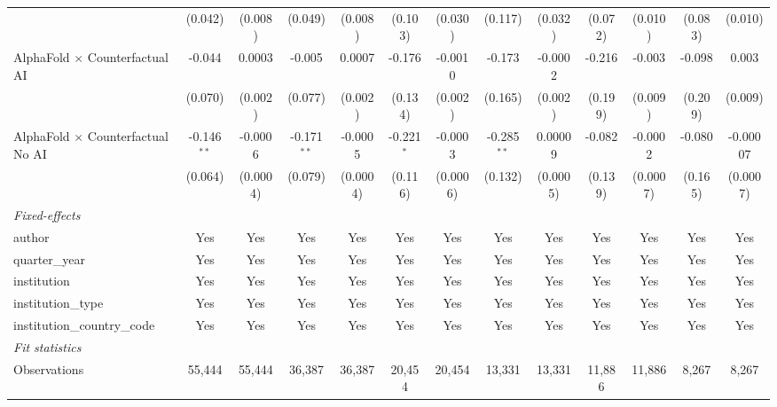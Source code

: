 \begin{tabular}{lcccccccccccc}
                                            & (0.042)       & (0.008)  & (0.049)       & (0.008)  & (0.103)      & (0.030)  & (0.117)       & (0.032)  & (0.072) & (0.010)  & (0.083) & (0.010)\\   
   AlphaFold $\times$ Counterfactual AI     & -0.044        & 0.0003   & -0.005        & 0.0007   & -0.176       & -0.0010  & -0.173        & -0.0002  & -0.216  & -0.003   & -0.098  & 0.003\\   
                                            & (0.070)       & (0.002)  & (0.077)       & (0.002)  & (0.134)      & (0.002)  & (0.165)       & (0.002)  & (0.199) & (0.009)  & (0.209) & (0.009)\\   
   AlphaFold $\times$ Counterfactual No AI  & -0.146$^{**}$ & -0.0006  & -0.171$^{**}$ & -0.0005  & -0.221$^{*}$ & -0.0003  & -0.285$^{**}$ & 0.00009  & -0.082  & -0.0002  & -0.080  & -0.00007\\   
                                            & (0.064)       & (0.0004) & (0.079)       & (0.0004) & (0.116)      & (0.0006) & (0.132)       & (0.0005) & (0.139) & (0.0007) & (0.165) & (0.0007)\\   
   \midrule
   \emph{Fixed-effects}\\
   author                                   & Yes           & Yes      & Yes           & Yes      & Yes          & Yes      & Yes           & Yes      & Yes     & Yes      & Yes     & Yes\\  
   quarter\_year                            & Yes           & Yes      & Yes           & Yes      & Yes          & Yes      & Yes           & Yes      & Yes     & Yes      & Yes     & Yes\\  
   institution                              & Yes           & Yes      & Yes           & Yes      & Yes          & Yes      & Yes           & Yes      & Yes     & Yes      & Yes     & Yes\\  
   institution\_type                        & Yes           & Yes      & Yes           & Yes      & Yes          & Yes      & Yes           & Yes      & Yes     & Yes      & Yes     & Yes\\  
   institution\_country\_code               & Yes           & Yes      & Yes           & Yes      & Yes          & Yes      & Yes           & Yes      & Yes     & Yes      & Yes     & Yes\\  
   \midrule
   \emph{Fit statistics}\\
   Observations                             & 55,444        & 55,444   & 36,387        & 36,387   & 20,454       & 20,454   & 13,331        & 13,331   & 11,886  & 11,886   & 8,267   & 8,267\\  

\end{tabular}
